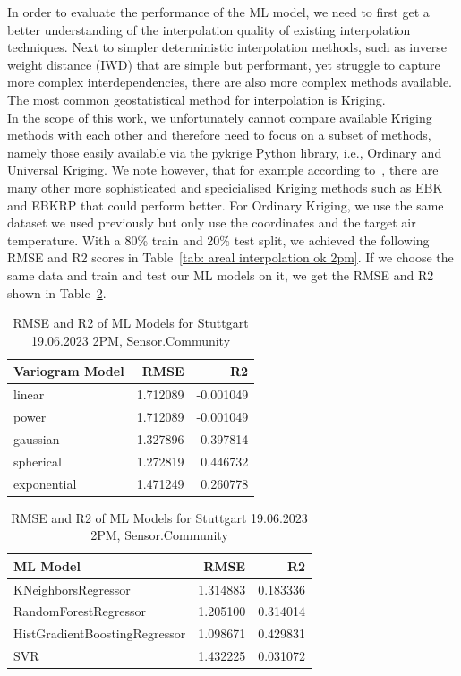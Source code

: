 In order to evaluate the performance of the ML model, we need to first get a better understanding of the interpolation quality of existing interpolation techniques. Next to simpler deterministic interpolation methods, such as inverse weight distance (IWD) that are simple but performant, yet struggle to capture more complex interdependencies, there are also more complex methods available. The most common geostatistical method for interpolation is Kriging.\\
In the scope of this work, we unfortunately cannot compare available Kriging methods with each other and therefore need to focus on a subset of methods, namely those easily available via the pykrige Python library, i.e., Ordinary and Universal Kriging. We note however, that for example according to~\cite{njoku2023effects}, there are many other more sophisticated and specicialised Kriging methods such as EBK and EBKRP that could perform better. For Ordinary Kriging, we use the same dataset we used previously but only use the coordinates and the target air temperature. With a 80\% train and 20\% test split, we achieved the following RMSE and R2 scores in Table~\ref{tab: areal interpolation ok 2pm}. If we choose the same data and train and test our ML models on it, we get the RMSE and R2 shown in Table~\ref{tab: areal interpolation ml models 2pm}.\\

\begin{table}[ht]
  \centering
  \begin{tabular}{lrr}
  \toprule
  Variogram Model &     RMSE &        R2 \\
  \midrule
          linear & 1.712089 & -0.001049 \\
            power & 1.712089 & -0.001049 \\
        gaussian & 1.327896 &  0.397814 \\
        spherical & 1.272819 &  0.446732 \\
      exponential & 1.471249 &  0.260778 \\
  \bottomrule
  \end{tabular}
  \label{tab: areal interpolation ok 2pm}
  \caption{RMSE and R2 of Ordinary Kriging for Stuttgart 19.06.2023 2PM, Sensor.Community}

  \begin{tabular}{lrr}
  \toprule
            ML Model &     RMSE &       R2 \\
  \midrule
            KNeighborsRegressor & 1.314883 & 0.183336 \\
          RandomForestRegressor & 1.205100 & 0.314014 \\
  HistGradientBoostingRegressor & 1.098671 & 0.429831 \\
                            SVR & 1.432225 & 0.031072 \\
  \bottomrule
  \end{tabular}
  \label{tab: areal interpolation ml models 2pm}
  \caption{RMSE and R2 of ML Models for Stuttgart 19.06.2023 2PM, Sensor.Community}
\end{table}

